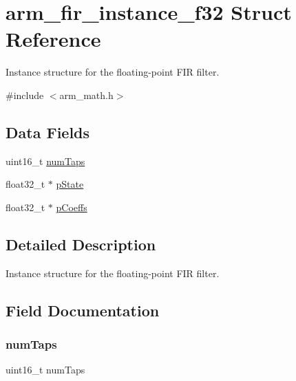 \hypertarget{structarm__fir__instance__f32}{}\section{arm\+\_\+fir\+\_\+instance\+\_\+f32 Struct Reference}
\label{structarm__fir__instance__f32}


Instance structure for the floating-\/point F\+IR filter.  




{\ttfamily \#include $<$arm\+\_\+math.\+h$>$}

\subsection*{Data Fields}
\begin{DoxyCompactItemize}
\item 
uint16\+\_\+t \hyperlink{structarm__fir__instance__f32_a751941891e47f522a7f5375fe8990aac}{num\+Taps}
\item 
float32\+\_\+t $\ast$ \hyperlink{structarm__fir__instance__f32_a335c87e6fdc4b96601d95a5de8b9c463}{p\+State}
\item 
float32\+\_\+t $\ast$ \hyperlink{structarm__fir__instance__f32_aacbb8dd8eeba4b21fc2bb40076405ee3}{p\+Coeffs}
\end{DoxyCompactItemize}


\subsection{Detailed Description}
Instance structure for the floating-\/point F\+IR filter. 

\subsection{Field Documentation}
\mbox{\label{structarm__fir__instance__f32_a751941891e47f522a7f5375fe8990aac}} 
\subsubsection{\texorpdfstring{num\+Taps}{numTaps}}
{\footnotesize\ttfamily uint16\+\_\+t num\+Taps}

